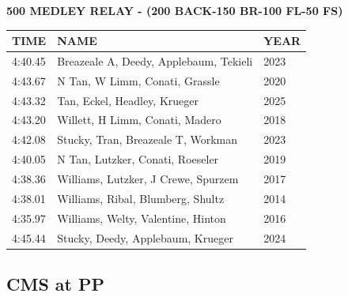 \begin{table}[H]
\centering
\begin{minipage}[t]{0.6\textwidth}
\centering
\textbf{500 MEDLEY RELAY - (200 BACK-150 BR-100 FL-50 FS)}\\[0.1cm]
\begin{tabular}{@{}p{1.8cm}p{2.8cm}p{1.2cm}@{}}
\hline
    \textbf{TIME} & \textbf{NAME} & \textbf{YEAR} \\
\hline
    4:40.45 & Breazeale A, Deedy, Applebaum, Tekieli & 2023 \\
    4:43.67 & N Tan, W Limm, Conati, Grassle & 2020 \\
    4:43.32 & Tan, Eckel, Headley, Krueger & 2025 \\
    4:43.20 & Willett, H Limm, Conati, Madero & 2018 \\
    4:42.08 & Stucky, Tran, Breazeale T, Workman & 2023 \\
    4:40.05 & N Tan, Lutzker, Conati, Roeseler & 2019 \\
    4:38.36 & Williams, Lutzker, J Crewe, Spurzem & 2017 \\
    4:38.01 & Williams, Ribal, Blumberg, Shultz & 2014 \\
    4:35.97 & Williams, Welty, Valentine, Hinton & 2016 \\
    4:45.44 & Stucky, Deedy, Applebaum, Krueger & 2024 \\
\hline
\end{tabular}
\end{minipage}
\end{table}


\newpage



\subsection{CMS at PP}

